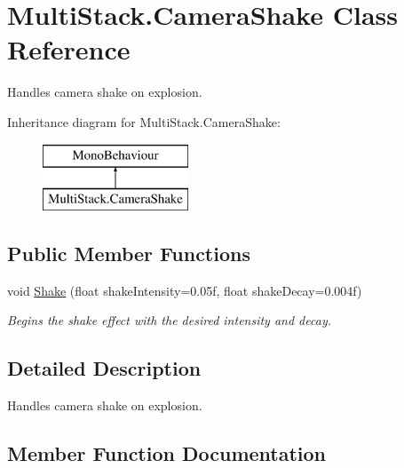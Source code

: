 \hypertarget{class_multi_stack_1_1_camera_shake}{}\section{Multi\+Stack.\+Camera\+Shake Class Reference}
\label{class_multi_stack_1_1_camera_shake}


Handles camera shake on explosion.  


Inheritance diagram for Multi\+Stack.\+Camera\+Shake\+:\begin{figure}[H]
\begin{center}
\leavevmode
\includegraphics[height=2.000000cm]{class_multi_stack_1_1_camera_shake}
\end{center}
\end{figure}
\subsection*{Public Member Functions}
\begin{DoxyCompactItemize}
\item 
void \hyperlink{class_multi_stack_1_1_camera_shake_a6571236e5ca1ba88f0a3114f9357e8f4}{Shake} (float shake\+Intensity=0.\+05f, float shake\+Decay=0.\+004f)
\begin{DoxyCompactList}\small\item\em Begins the shake effect with the desired intensity and decay. \end{DoxyCompactList}\end{DoxyCompactItemize}


\subsection{Detailed Description}
Handles camera shake on explosion. 



\subsection{Member Function Documentation}
\hypertarget{class_multi_stack_1_1_camera_shake_a6571236e5ca1ba88f0a3114f9357e8f4}{}
